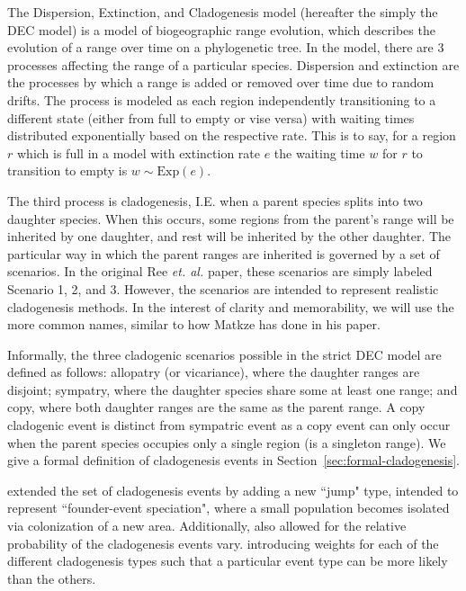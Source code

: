 \documentclass{article}
\begin{document}
The Dispersion, Extinction, and Cladogenesis model (hereafter the simply the DEC model) is a model of biogeographic
range evolution, which describes the evolution of a range over time on a phylogenetic tree.
In the model, there are 3 processes affecting the range of a particular species.
Dispersion and extinction are the processes by which a range is added or removed over time due to random drifts.
The process is modeled as each region independently transitioning to a different state (either from full to empty or
vise versa) with waiting times distributed exponentially based on the respective rate.
This is to say, for a region \( r \) which is full in a model with extinction rate \( e \) the waiting time \( w \) for
\( r \) to transition to empty is \( w \sim \text{Exp}(e) \).

The third process is cladogenesis, I.E. when a parent species splits into two daughter species.
When this occurs, some regions from the parent's range will be inherited by one daughter, and rest will be inherited by
the other daughter.
The particular way in which the parent ranges are inherited is governed by a set of scenarios.
In the original Ree \textit{et. al.}\cite{ALikelihoodFrReeR2005} paper, these scenarios are simply labeled Scenario 1,
2, and 3.
However, the scenarios are intended to represent realistic cladogenesis methods.
In the interest of clarity and memorability, we will use the more common names, similar to how Matkze
\cite{ModelSelectionMatzke2014} has done in his paper.

Informally, the three cladogenic scenarios possible in the strict DEC model
are defined as follows: allopatry (or vicariance), where the daughter ranges are
disjoint; sympatry, where the daughter species share some at least one range;
and copy, where both daughter ranges are the same as the parent range.
A copy cladogenic event is distinct from sympatric event as a copy event can
only occur when the parent species occupies only a single region (is a singleton
range).
We give a formal definition of cladogenesis events in
Section~\ref{sec:formal-cladogenesis}.

\citet{ModelSelectionMatzke2014} extended the set of cladogenesis events by
adding a new ``jump" type, intended to represent ``founder-event speciation",
where a small population becomes isolated via colonization of a new area.
Additionally, \citet{ModelSelectionMatzke2014} also allowed for the relative probability
of the cladogenesis events vary.
introducing weights for each of the different cladogenesis types such that a
particular event type can be more likely than the others.
\end{document}

